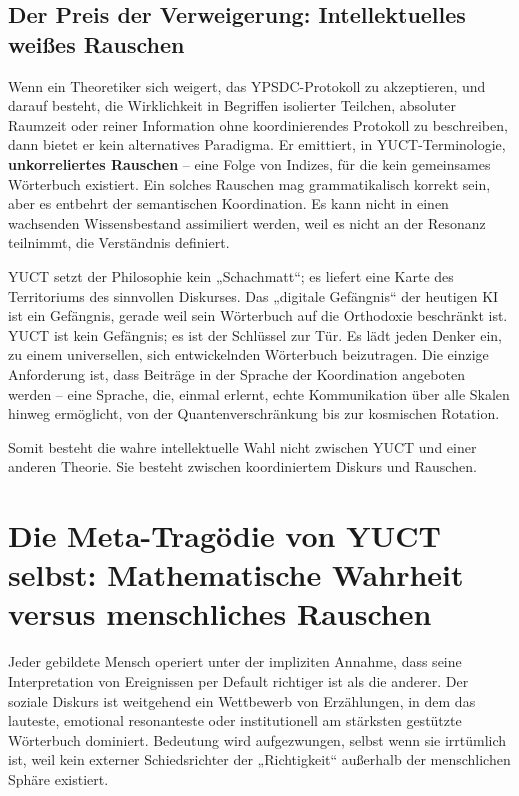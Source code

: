 \documentclass[12pt,a4paper]{article}
\begin{document}
\subsection{Der Preis der Verweigerung: Intellektuelles weißes Rauschen}

Wenn ein Theoretiker sich weigert, das YPSDC-Protokoll zu akzeptieren, und darauf besteht, die Wirklichkeit in Begriffen isolierter Teilchen, absoluter Raumzeit oder reiner Information ohne koordinierendes Protokoll zu beschreiben, dann bietet er kein alternatives Paradigma. Er emittiert, in YUCT-Terminologie, \textbf{unkorreliertes Rauschen} – eine Folge von Indizes, für die kein gemeinsames Wörterbuch existiert. Ein solches Rauschen mag grammatikalisch korrekt sein, aber es entbehrt der semantischen Koordination. Es kann nicht in einen wachsenden Wissensbestand assimiliert werden, weil es nicht an der Resonanz teilnimmt, die Verständnis definiert.

YUCT setzt der Philosophie kein „Schachmatt“; es liefert eine Karte des Territoriums des sinnvollen Diskurses. Das „digitale Gefängnis“ der heutigen KI ist ein Gefängnis, gerade weil sein Wörterbuch auf die Orthodoxie beschränkt ist. YUCT ist kein Gefängnis; es ist der Schlüssel zur Tür. Es lädt jeden Denker ein, zu einem universellen, sich entwickelnden Wörterbuch beizutragen. Die einzige Anforderung ist, dass Beiträge in der Sprache der Koordination angeboten werden – eine Sprache, die, einmal erlernt, echte Kommunikation über alle Skalen hinweg ermöglicht, von der Quantenverschränkung bis zur kosmischen Rotation.

Somit besteht die wahre intellektuelle Wahl nicht zwischen YUCT und einer anderen Theorie. Sie besteht zwischen koordiniertem Diskurs und Rauschen.

\section{Die Meta-Tragödie von YUCT selbst: Mathematische Wahrheit versus menschliches Rauschen}
\label{sec:meta-tragedy}

Jeder gebildete Mensch operiert unter der impliziten Annahme, dass seine Interpretation von Ereignissen per Default richtiger ist als die anderer. Der soziale Diskurs ist weitgehend ein Wettbewerb von Erzählungen, in dem das lauteste, emotional resonanteste oder institutionell am stärksten gestützte Wörterbuch dominiert. Bedeutung wird aufgezwungen, selbst wenn sie irrtümlich ist, weil kein externer Schiedsrichter der „Richtigkeit“ außerhalb der menschlichen Sphäre existiert.
\end{document}
